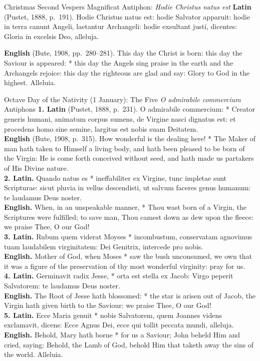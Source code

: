 \begin{massbox}{Christmas Second Vespers Magnificat Antiphon: \textit{Hodie Christus natus est}}
\textbf{Latin} (Pustet, 1888, p.~191). Hodie Christus natus est: hodie Salvator
apparuit: hodie in terra canunt Angeli, laetantur Archangeli: hodie exsultant
justi, dicentes: Gloria in excelsis Deo, alleluja.

\textbf{English} (Bute, 1908, pp.~280--281). This day the Christ is born: this
day the Saviour is appeared: * this day the Angels sing praise in the earth and
the Archangels rejoice: this day the righteous are glad and say: Glory to God in
the highest. Alleluia.
\end{massbox}

\begin{massbox}{Octave Day of the Nativity (1 January): The Five \textit{O admirabile commercium} Antiphons}
\textbf{1. Latin} (Pustet, 1888, p.~231). O admirabile commercium: * Creator
generis humani, animatum corpus sumens, de Virgine nasci dignatus est: et
procedens homo sine semine, largitus est nobis suam Deitatem.\\
\textbf{English} (Bute, 1908, p.~315). How wonderful is the dealing here! * The
Maker of man hath taken to Himself a living body, and hath been pleased to be
born of the Virgin: He is come forth conceived without seed, and hath made us
partakers of His Divine nature.\\[0.35em]
\textbf{2. Latin.} Quando natus es * ineffabiliter ex Virgine, tunc impletae
sunt Scripturae: sicut pluvia in vellus descendisti, ut salvum faceres genus
humanum: te laudamus Deus noster.\\
\textbf{English.} When, in an unspeakable manner, * Thou wast born of a Virgin,
the Scriptures were fulfilled; to save man, Thou camest down as dew upon the
fleece: we praise Thee, O our God!\\[0.35em]
\textbf{3. Latin.} Rubum quem viderat Moyses * incombustum, conservatam
agnovimus tuam laudabilem virginitatem: Dei Genitrix, intercede pro nobis.\\
\textbf{English.} Mother of God, when Moses * saw the bush unconsumed, we own
that it was a figure of the preservation of thy most wonderful virginity: pray
for us.\\[0.35em]
\textbf{4. Latin.} Germinavit radix Jesse, * orta est stella ex Jacob: Virgo
peperit Salvatorem: te laudamus Deus noster.\\
\textbf{English.} The Root of Jesse hath blossomed: * the star is arisen out of
Jacob, the Virgin hath given birth to the Saviour: we praise Thee, O our God!\\[0.35em]
\textbf{5. Latin.} Ecce Maria genuit * nobis Salvatorem, quem Joannes videns
exclamavit, dicens: Ecce Agnus Dei, ecce qui tollit peccata mundi, alleluja.\\
\textbf{English.} Behold, Mary hath borne * for us a Saviour; John beheld Him
and cried, saying: Behold, the Lamb of God, behold Him that taketh away the sins
of the world. Alleluia.
\end{massbox}

